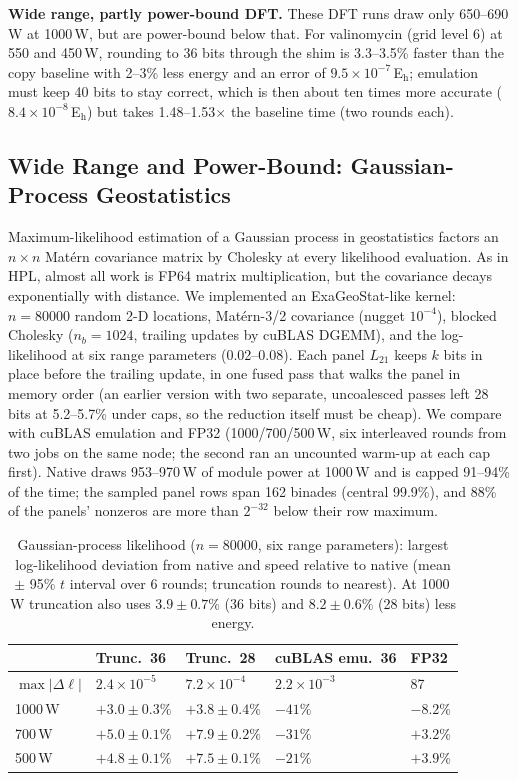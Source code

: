 \documentclass[conference]{IEEEtran}
\newcommand{\W}{\,W}
\newcommand{\Eh}{\,E$_\mathrm{h}$}
\newcommand{\ee}[2]{#1{\times}10^{#2}}  %
\newcommand{\pct}{\%}
\begin{document}
\textbf{Wide range, partly power-bound DFT.} These DFT runs draw only 650--690\W{} at 1000\W, but are power-bound
below that. For valinomycin (grid level 6) at 550 and 450\W, rounding to 36 bits through the shim is 3.3--3.5\pct{}
faster than the copy baseline with 2--3\pct{} less energy and an error of $\ee{9.5}{-7}$\Eh; emulation must keep 40
bits to stay correct, which is then about ten times more accurate ($\ee{8.4}{-8}$\Eh) but takes 1.48--1.53$\times$
the baseline time (two rounds each).

\subsection{Wide Range and Power-Bound: Gaussian-Process Geostatistics}\label{sec:gp}

Maximum-likelihood estimation of a Gaussian process in geostatistics factors an $n{\times}n$ Matérn covariance matrix
by Cholesky at every likelihood evaluation. As in HPL, almost all work is FP64 matrix multiplication, but the
covariance decays exponentially with distance. We implemented an ExaGeoStat-like kernel: $n=80000$ random 2-D
locations, Matérn-3/2 covariance (nugget $10^{-4}$), blocked Cholesky ($n_b=1024$, trailing updates by cuBLAS DGEMM),
and the log-likelihood at six range parameters (0.02--0.08). Each panel $L_{21}$ keeps $k$ bits in place before the
trailing update, in one fused pass that walks the panel in memory order (an earlier version with two separate,
uncoalesced passes left 28 bits at 5.2--5.7\pct{} under caps, so the reduction itself must be cheap). We compare
with cuBLAS emulation and FP32 (1000/700/500\W, six interleaved rounds from two jobs on the same node; the second
ran an uncounted warm-up at each cap first). Native draws
953--970\W{} of module power at 1000\W{} and is capped 91--94\pct{} of the time; the sampled panel rows span 162
binades (central 99.9\pct), and 88\pct{} of the panels' nonzeros are more than $2^{-32}$ below their row maximum.

\begin{table}[t]
\caption{Gaussian-process likelihood ($n=80000$, six range parameters): largest log-likelihood deviation from
native and speed relative to native (mean $\pm$ 95\pct{} $t$ interval over 6 rounds; truncation rounds to nearest). At
1000\W{} truncation also uses $3.9\pm0.7\pct$ (36 bits) and $8.2\pm0.6\pct$ (28 bits) less energy.}\label{tab:gp}
\centering\footnotesize\setlength{\tabcolsep}{3pt}
\begin{tabular}{@{}lllll@{}}
\toprule
 & Trunc.\ 36 & Trunc.\ 28 & cuBLAS emu.\ 36 & FP32 \\
\midrule
$\max|\Delta\ell|$ & $\ee{2.4}{-5}$ & $\ee{7.2}{-4}$ & $\ee{2.2}{-3}$ & 87 \\
1000\W & $+3.0\pm0.3\pct$ & $+3.8\pm0.4\pct$ & $-41\pct$ & $-8.2\pct$ \\
700\W & $+5.0\pm0.1\pct$ & $+7.9\pm0.2\pct$ & $-31\pct$ & $+3.2\pct$ \\
500\W & $+4.8\pm0.1\pct$ & $+7.5\pm0.1\pct$ & $-21\pct$ & $+3.9\pct$ \\
\bottomrule
\end{tabular}
\end{table}
\end{document}
